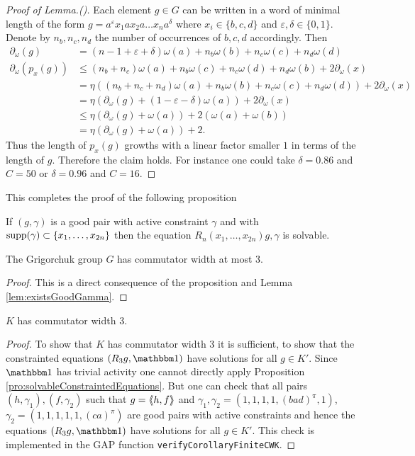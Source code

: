 \documentclass[a4paper,12pt]{article}
\begin{document}
\begin{proof}[Proof of Lemma.(\cite{Bartholdi:Growth})] 
 Each element $g\in G$ can be written in a word of minimal length of the form $g=a^\varepsilon x_1 a x_2 a\ldots x_n a^\delta$ where
 $x_i\in \{b,c,d\}$ and $\varepsilon,\delta\in \{0,1\}$. Denote by $n_b,n_c,n_d$ the number of occurrences of $b,c,d$ accordingly. 
 Then
 \begin{align*}
  \partial_\omega(g) &= (n-1+\varepsilon+\delta)\omega(a)+n_b\omega(b)+n_c\omega(c)+n_d\omega(d)\\
  \partial_\omega(p_x(g)) &\leq (n_b+n_c)\omega(a)+n_b\omega(c)+n_c\omega(d)+n_d\omega(b) + 2\partial_\omega(x)\\
  &= \eta\left( (n_b+n_c+n_d)\omega(a)+n_b\omega(b)+n_c\omega(c)+n_d\omega(d) \right) + 2\partial_\omega(x)\\
  &= \eta(\partial_\omega(g) +(1-\varepsilon-\delta)\omega(a)) + 2\partial_\omega(x) \\
  &\leq \eta(\partial_\omega(g)+\omega(a)) + 2(\omega(a)+\omega(b))\\
  &= \eta(\partial_\omega(g)+\omega(a)) + 2.
 \end{align*}
 Thus the length of $p_x(g)$ growths with a linear factor smaller $1$ in terms of the length of $g$. Therefore the claim holds.
 For instance one could take $\delta =0.86$ and $C=50$ or $\delta=0.96$ and $C=16$.
\end{proof}
This completes the proof of the following proposition
\begin{pro}\label{pro:solvableConstraintedEquations}
 If $(g,\gamma)$ is a good pair with active constraint $\gamma$ and with $\textup{supp}(\gamma)\subset\{x_1,\ldots,x_{2n}\}$
 then the equation $R_n(x_1,\ldots,x_{2n})g,\gamma$ is solvable. 
\end{pro}
\begin{cor}
 The Grigorchuk group $G$ has commutator width at most $3$.
\end{cor}
\begin{proof}
 This is a direct consequence of the proposition and Lemma \ref{lem:existsGoodGamma}.
\end{proof}


\begin{cor}
 $K$ has commutator width $3$. 
\end{cor}
\begin{proof}
 To show that $K$ has commutator width $3$ it is sufficient, to show that the constrainted equations $(R_3g,\id)$ have solutions for all $g\in K'$. 
 Since $\id$ has trivial activity one cannot directly apply Proposition \ref{pro:solvableConstraintedEquations}.
 But one can check that all pairs $(h,\gamma_1),(f,\gamma_2)$
 such that $g=\langle\negthickspace\langle h,f\rangle\negthickspace\rangle$ and $\gamma_1,\gamma_2=(1,1,1,1,(bad)^\pi,1)$, $\gamma_2=(1,1,1,1,1,(ca)^\pi)$
 are good pairs with active constraints and hence the equations $(R_3g,\id)$ have solutions for all $g\in K'$. 
 This check is implemented in the GAP function \lstinline{verifyCorollaryFiniteCWK}. 
\end{proof}
\end{document}

